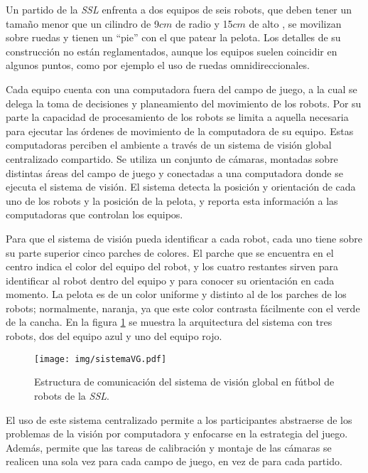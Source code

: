 Un partido de la \emph{SSL} enfrenta a dos equipos de seis robots, que deben
tener un tamaño menor que un cilindro de 9$cm$ de radio y 15$cm$ de alto
\cite{sslrules2015}, se movilizan sobre ruedas y tienen un ``pie'' con el que
patear la pelota. Los detalles de su construcción no están reglamentados,
aunque los equipos suelen coincidir en algunos puntos, como por ejemplo el uso
de ruedas omnidireccionales.

Cada equipo cuenta con una computadora fuera del campo de juego, a la cual se
delega la toma de decisiones y planeamiento del movimiento de los robots. Por
su parte la capacidad de procesamiento de los robots se limita a aquella
necesaria para ejecutar las órdenes de movimiento de la computadora de su
equipo. Estas computadoras perciben el ambiente a través de un sistema de
visión global centralizado compartido. Se utiliza un conjunto de cámaras,
montadas sobre distintas áreas del campo de juego y conectadas a una
computadora donde se ejecuta el sistema de visión. El sistema detecta la
posición y orientación de cada uno de los robots y la posición de la pelota, y
reporta esta información a las computadoras que controlan los equipos.

Para que el sistema de visión pueda identificar a cada robot, cada uno tiene
sobre su parte superior cinco parches de colores. El parche que se encuentra en
el centro indica el color del equipo del robot, y los cuatro restantes sirven
para identificar al robot dentro del equipo y para conocer su orientación en
cada momento. La pelota es de un color uniforme y distinto al de los parches de
los robots; normalmente, naranja, ya que este color contrasta fácilmente con el
verde de la cancha. En la figura \ref{sistemaVG} se muestra la arquitectura del
sistema con tres robots, dos del equipo azul y uno del equipo rojo.

\begin{figure}[h]

	\texttt{[image: img/sistemaVG.pdf]}

	\caption{Estructura de comunicación del sistema de visión global en
	fútbol de robots de la \emph{SSL}.}

	\label{sistemaVG}

\end{figure}

El uso de este sistema centralizado permite a los participantes abstraerse de
los problemas de la visión por computadora y enfocarse en la estrategia del
juego. Además, permite que las tareas de calibración y montaje de las cámaras se
realicen una sola vez para cada campo de juego, en vez de para cada partido.

